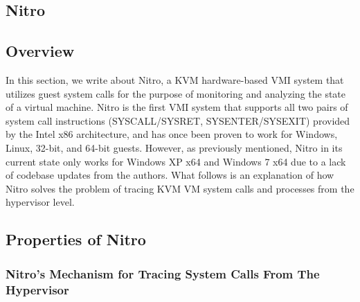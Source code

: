 \documentclass{report}
\begin{document}
\begin{spacing}{1.5}
\section{Nitro}

\subsection{Overview}

{\large
In this section, we write about Nitro, a KVM hardware-based VMI system that utilizes guest system calls for the purpose of monitoring and analyzing the state of a virtual machine. Nitro is the first VMI system that supports all two pairs of system call instructions (SYSCALL/SYSRET, SYSENTER/SYSEXIT) provided by the Intel x86 architecture, and has once been proven to work for Windows, Linux, 32-bit, and 64-bit guests. However, as previously mentioned, Nitro in its current state only works for Windows XP x64 and Windows 7 x64 due to a lack of codebase updates from the authors. What follows is an explanation of how Nitro solves the problem of tracing KVM VM system calls and processes from the hypervisor level.
\newline
}



\subsection{Properties of Nitro}


\subsubsection{Nitro's Mechanism for Tracing System Calls From The Hypervisor}


\end{spacing}
\end{document}
